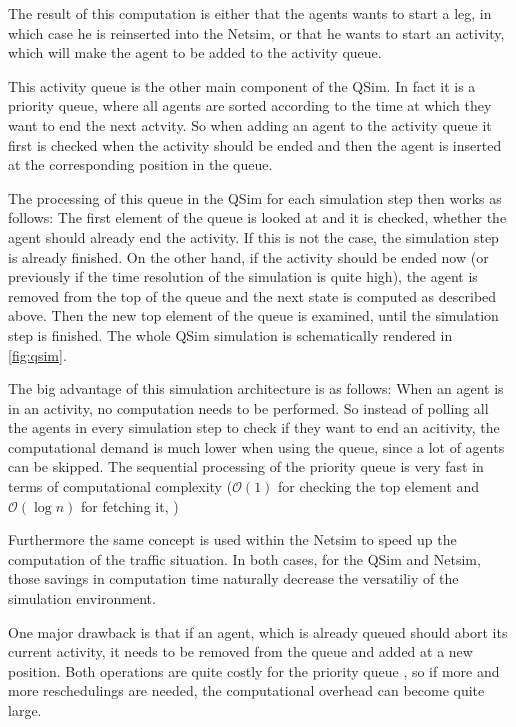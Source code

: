 The result of this computation is either that the agents wants to start a leg, in
which case he is reinserted into the Netsim, or that he wants to start an activity,
which will make the agent to be added to the activity queue.

This activity queue is the other main component of the QSim. In fact it is a
priority queue, where all agents are sorted according to the time at which they
want to end the next actvity. So when adding an agent to the activity queue it first
is checked when the activity should be ended and then the agent is inserted at the
corresponding position in the queue.

The processing of this queue in the QSim for each simulation step then works as
follows: The first element of the queue is looked at and it is checked, whether the
agent should already end the activity. If this is not the case, the simulation step
is already finished. On the other hand, if the activity should be ended now (or
previously if the time resolution of the simulation is quite high), the agent is
removed from the top of the queue and the next state is computed as described above.
Then the new top element of the queue is examined, until the simulation step is
finished. The whole QSim simulation is schematically rendered in \cref{fig:qsim}.

The big advantage of this simulation architecture is as follows: When an agent is
in an activity, no computation needs to be performed. So instead of polling all
the agents in every simulation step to check if they want to end an acitivity, the
computational demand is much lower when using the queue, since a lot of agents can
be skipped. The sequential processing of the priority queue is very fast in terms
of computational complexity ($\mathcal{O}(1)$ for checking the top element
and $\mathcal{O}(\log n)$ for fetching it, \citet{JavaPQ})

Furthermore the same concept is used within the Netsim to speed up the computation
of the traffic situation. In both cases, for the QSim and Netsim, those savings in
computation time naturally decrease the versatiliy of the simulation environment.

One major drawback is that if an agent, which is already queued should abort its
current activity, it needs to be removed from the queue and added at a new position.
Both operations are quite costly for the priority queue \citep{JavaPQ}, so
if more and more reschedulings are needed, the computational overhead can become
quite large.


